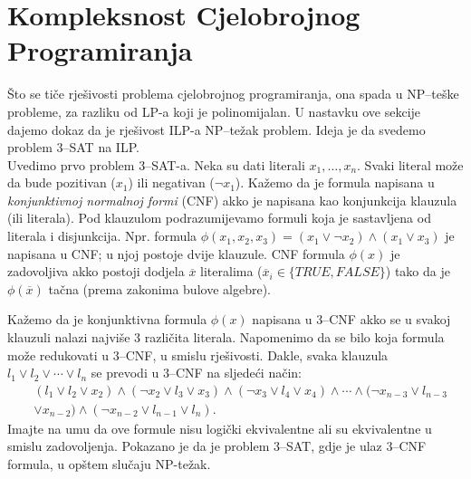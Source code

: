 \documentclass[a4paper, utf8, 11pt, colorlinks]{book}
\begin{document}
 \section{Kompleksnost Cjelobrojnog Programiranja}
   Što se tiče rješivosti problema cjelobrojnog programiranja, ona spada u NP--teške probleme, za razliku od LP-a koji je polinomijalan. U nastavku ove sekcije dajemo dokaz da je rješivost ILP-a NP--težak problem.  Ideja je da  svedemo problem 3--SAT na ILP.\\ 
   Uvedimo prvo problem 3--SAT-a. Neka su dati literali $x_1, \ldots, x_n$. Svaki literal može da bude pozitivan ($x_1$) ili negativan  ($\neg x_1$). Kažemo da je formula napisana u \emph{konjunktivnoj normalnoj formi} (CNF) akko je napisana kao konjunkcija klauzula (ili literala). Pod klauzulom podrazumijevamo formuli koja je sastavljena od literala i disjunkcija. Npr. formula $\phi(x_1, x_2, x_3)= (x_1 \vee  \neg x_2) \wedge (x_1 \vee x_3)$ je napisana u CNF; u njoj postoje dvije klauzule. CNF formula $\phi(x)$ je zadovoljiva akko postoji dodjela $\overline{x}$ literalima ($\overline{x}_i \in \{TRUE, FALSE\}$) tako da je $\phi(\overline{x})$ tačna (prema zakonima bulove algebre).  
   
   Kažemo da je konjunktivna formula $\phi(x)$  napisana u 3--CNF  akko se u svakoj klauzuli nalazi najviše 3 različita literala. Napomenimo da se bilo koja formula može redukovati u 3--CNF, u smislu rješivosti. Dakle, svaka klauzula 
   $l_1 \vee l_2 \vee \cdots \vee l_n$ se prevodi u 3--CNF na sljedeći način:
   \begin{align*}
       &(l_1 \vee l_2 \vee x_2) \wedge ( \neg x_2 \vee l_3 \vee x_3) \wedge ( \neg x_3 \vee l_4 \vee x_4 ) \wedge \cdots \wedge (\neg x_{n-3} \vee l_{n-3} \\
       &\vee x_{n-2} ) \wedge ( \neg x_{n-2} \vee l_{n-1} \vee l_n ).  
    \end{align*}    
      Imajte na umu da ove formule nisu logički ekvivalentne ali su ekvivalentne u smislu zadovoljenja. 
    Pokazano je da je problem 3--SAT, gdje je ulaz 3--CNF formula,  u opštem slučaju NP-težak.  
    
\end{document}
